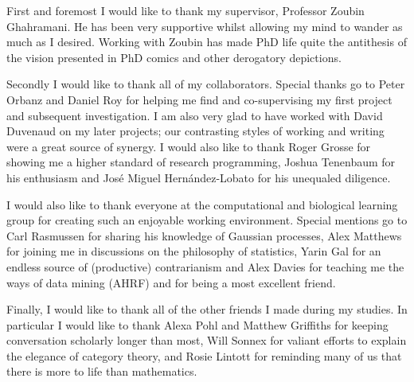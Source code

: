 
\begin{acknowledgements}      

First and foremost I would like to thank my supervisor, Professor Zoubin Ghahramani.
He has been very supportive whilst allowing my mind to wander as much as I desired.
Working with Zoubin has made PhD life quite the antithesis of the vision presented in PhD comics and other derogatory depictions.

Secondly I would like to thank all of my collaborators.
Special thanks go to Peter Orbanz and Daniel Roy for helping me find and co-supervising my first project and subsequent investigation.
I am also very glad to have worked with David Duvenaud on my later projects; our contrasting styles of working and writing were a great source of synergy.
I would also like to thank Roger Grosse for showing me a higher standard of research programming, Joshua Tenenbaum for his enthusiasm and Jos\'{e} Miguel Hern\'{a}ndez-Lobato for his unequaled diligence.

I would also like to thank everyone at the computational and biological learning group for creating such an enjoyable working environment.
Special mentions go to Carl Rasmussen for sharing his knowledge of Gaussian processes, Alex Matthews for joining me in discussions on the philosophy of statistics, Yarin Gal for an endless source of (productive) contrarianism and Alex Davies for teaching me the ways of data mining (AHRF) and for being a most excellent friend.

Finally, I would like to thank all of the other friends I made during my studies.
In particular I would like to thank Alexa Pohl and Matthew Griffiths for keeping conversation scholarly longer than most, Will Sonnex for valiant efforts to explain the elegance of category theory, and Rosie Lintott for reminding many of us that there is more to life than mathematics.

\end{acknowledgements}
